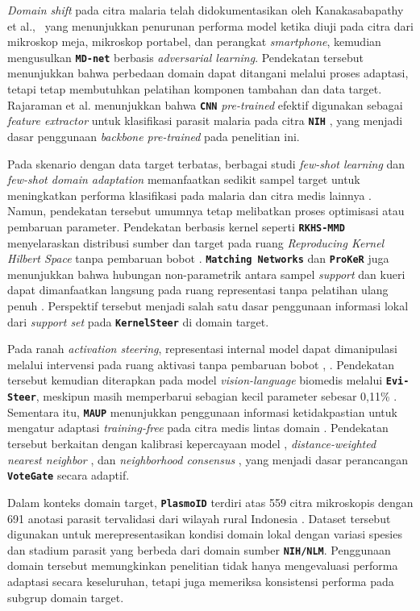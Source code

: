 \documentclass[conference]{IEEEtran}
\newcommand{\nama}[1]{\textbf{\texttt{#1}}}
\begin{document}
\textit{Domain shift} pada citra malaria telah didokumentasikan oleh Kanakasabapathy et al.,~\cite{b2} yang menunjukkan penurunan performa model ketika diuji pada citra dari mikroskop meja, mikroskop portabel, dan perangkat \textit{smartphone}, kemudian mengusulkan \nama{MD-net} berbasis \textit{adversarial learning}. Pendekatan tersebut menunjukkan bahwa perbedaan domain dapat ditangani melalui proses adaptasi, tetapi tetap membutuhkan pelatihan komponen tambahan dan data target. Rajaraman et al. menunjukkan bahwa \nama{CNN} \textit{pre-trained} efektif digunakan sebagai \textit{feature extractor} untuk klasifikasi parasit malaria pada citra \nama{NIH} \cite{b15}, yang menjadi dasar penggunaan \textit{backbone pre-trained} pada penelitian ini.

Pada skenario dengan data target terbatas, berbagai studi \textit{few-shot learning} dan \textit{few-shot domain adaptation} memanfaatkan sedikit sampel target untuk meningkatkan performa klasifikasi pada malaria dan citra medis lainnya \cite{b3,b4,b6,b7,b8,b9}. Namun, pendekatan tersebut umumnya tetap melibatkan proses optimisasi atau pembaruan parameter. Pendekatan berbasis kernel seperti \nama{RKHS-MMD} menyelaraskan distribusi sumber dan target pada ruang \textit{Reproducing Kernel Hilbert Space} tanpa pembaruan bobot \cite{b14}. \nama{Matching Networks} dan \nama{ProKeR} juga menunjukkan bahwa hubungan non-parametrik antara sampel \textit{support} dan kueri dapat dimanfaatkan langsung pada ruang representasi tanpa pelatihan ulang penuh \cite{b16,b17}. Perspektif tersebut menjadi salah satu dasar penggunaan informasi lokal dari \textit{support set} pada \nama{KernelSteer} di domain target.

Pada ranah \textit{activation steering}, representasi internal model dapat dimanipulasi melalui intervensi pada ruang aktivasi tanpa pembaruan bobot \cite{b10}, \cite{b11}. Pendekatan tersebut kemudian diterapkan pada model \textit{vision-language} biomedis melalui \nama{Evi-Steer}, meskipun masih memperbarui sebagian kecil parameter sebesar 0,11\% \cite{b12}. Sementara itu, \nama{MAUP} menunjukkan penggunaan informasi ketidakpastian untuk mengatur adaptasi \textit{training-free} pada citra medis lintas domain \cite{b13}. Pendekatan tersebut berkaitan dengan kalibrasi kepercayaan model \cite{b19}, \textit{distance-weighted nearest neighbor} \cite{b20}, dan \textit{neighborhood consensus} \cite{b21}, yang menjadi dasar perancangan \nama{VoteGate} secara adaptif.

Dalam konteks domain target, \nama{PlasmoID} terdiri atas 559 citra mikroskopis dengan 691 anotasi parasit tervalidasi dari wilayah rural Indonesia \cite{b22}. Dataset tersebut digunakan untuk merepresentasikan kondisi domain lokal dengan variasi spesies dan stadium parasit yang berbeda dari domain sumber \nama{NIH/NLM}. Penggunaan domain tersebut memungkinkan penelitian tidak hanya mengevaluasi performa adaptasi secara keseluruhan, tetapi juga memeriksa konsistensi performa pada subgrup domain target.
\end{document}
